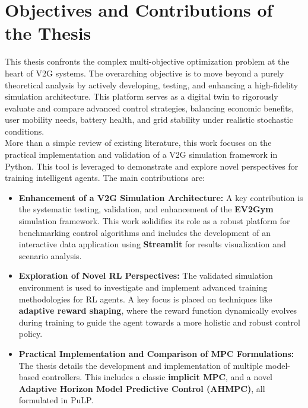 \section{Objectives and Contributions of the Thesis}
This thesis confronts the complex multi-objective optimization problem at the heart of V2G systems. The overarching objective is to move beyond a purely theoretical analysis by actively developing, testing, and enhancing a high-fidelity simulation architecture. This platform serves as a digital twin to rigorously evaluate and compare advanced control strategies, balancing economic benefits, user mobility needs, battery health, and grid stability under realistic stochastic conditions.
\\
\noindent
More than a simple review of existing literature, this work focuses on the practical implementation and validation of a V2G simulation framework in Python. This tool is leveraged to demonstrate and explore novel perspectives for training intelligent agents. The main contributions are:

\begin{itemize}
    \item \textbf{Enhancement of a V2G Simulation Architecture:} A key contribution is the systematic testing, validation, and enhancement of the \textbf{EV2Gym} simulation framework. This work solidifies its role as a robust platform for benchmarking control algorithms and includes the development of an interactive data application using \textbf{Streamlit} for results visualization and scenario analysis.


    \item \textbf{Exploration of Novel RL Perspectives:} The validated simulation environment is used to investigate and implement advanced training methodologies for RL agents. A key focus is placed on techniques like \textbf{adaptive reward shaping}, where the reward function dynamically evolves during training to guide the agent towards a more holistic and robust control policy.


    \item \textbf{Practical Implementation and Comparison of MPC Formulations:} The thesis details the development and implementation of multiple model-based controllers. This includes a classic \textbf{implicit MPC}, and a novel \textbf{Adaptive Horizon Model Predictive Control (AHMPC)}, all formulated in PuLP. \end{itemize}



